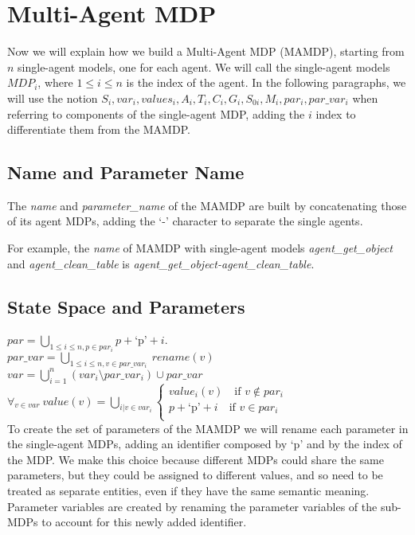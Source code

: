 \section{Multi-Agent MDP}
Now we will explain how we build a Multi-Agent MDP (MAMDP), starting from $n$ single-agent models, one for each agent. We will call the single-agent models $MDP_i$, where $1 \leq i \leq n $ is the index of the agent. In the following paragraphs, we will use the notion $S_i, var_i, values_i, A_i, T_i, C_i, G_i, S_{0i}, M_i, par_i, par\_var_i$ when referring to components of the single-agent MDP, adding the $i$ index to differentiate them from the MAMDP. 
 
\subsection{Name and Parameter Name}
The \textit{name} and \textit{parameter\_name} of the MAMDP are built by concatenating those of its agent MDPs, adding the `-' character to separate the single agents.

For example, the \textit{name} of MAMDP with single-agent models \textit{agent\_get\_object} and  \textit{agent\_clean\_table} is \textit{agent\_get\_object-agent\_clean\_table}.

\subsection{State Space and Parameters}
$par=\bigcup_{1 \leq i \leq n, p \in par_i} p+\text{`p'}+i $. \\
$par\_var=\bigcup_{1 \leq i \leq n, v \in par\_var_i} \> rename(v)$ \\
$var=\bigcup_{i=1}^{n}(var_i \setminus par\_var_i) \cup par\_var$ \\
$\forall_{v \in var}\> value(v)=\bigcup_{i| v \in var_i} 
\begin{cases}
	 value_i(v) \quad \text{if } v \not \in par_i \\
	 p+\text{`p'}+i \quad \text{if } v \in par_i \\
\end{cases}$ \\ 

To create the set of parameters of the MAMDP we will rename each parameter in the single-agent MDPs, adding an identifier composed by `p' and by the index of the MDP. We make this choice because different MDPs could share the same parameters, but they could be assigned to different values, and so need to be treated as separate entities, even if they have the same semantic meaning. Parameter variables are created by renaming the parameter variables of the sub-MDPs to account for this newly added identifier.

